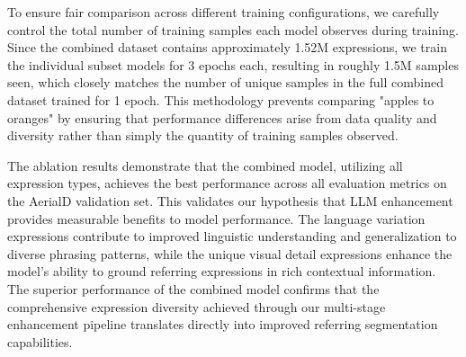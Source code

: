 To ensure fair comparison across different training configurations, we carefully control the total number of training samples each model observes during training. Since the combined dataset contains approximately 1.52M expressions, we train the individual subset models for 3 epochs each, resulting in roughly 1.5M samples seen, which closely matches the number of unique samples in the full combined dataset trained for 1 epoch. This methodology prevents comparing "apples to oranges" by ensuring that performance differences arise from data quality and diversity rather than simply the quantity of training samples observed.

The ablation results demonstrate that the combined model, utilizing all expression types, achieves the best performance across all evaluation metrics on the AerialD validation set. This validates our hypothesis that LLM enhancement provides measurable benefits to model performance. The language variation expressions contribute to improved linguistic understanding and generalization to diverse phrasing patterns, while the unique visual detail expressions enhance the model's ability to ground referring expressions in rich contextual information. The superior performance of the combined model confirms that the comprehensive expression diversity achieved through our multi-stage enhancement pipeline translates directly into improved referring segmentation capabilities.
